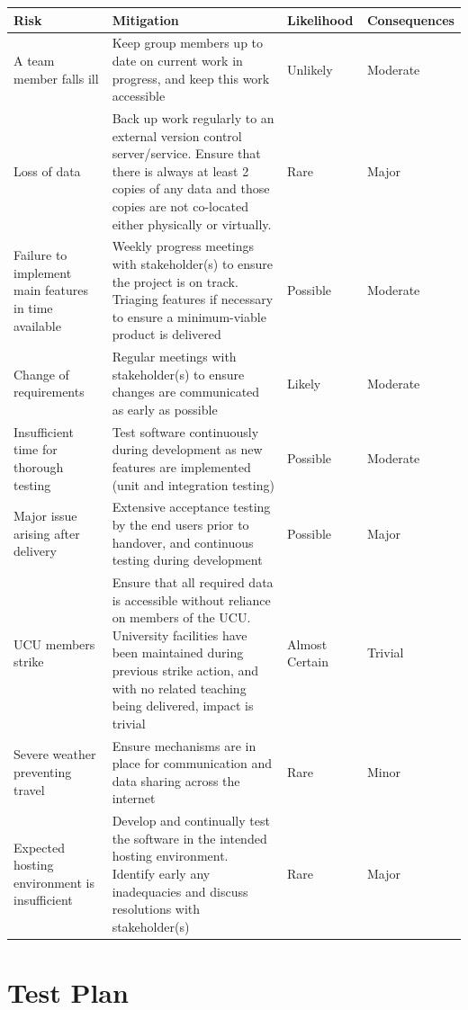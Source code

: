 \documentclass[11pt, a4paper]{article}
\begin{document}
\begin{landscape}
\begin{tabulary}{1.8\textwidth}{L|L|l|l}
	Risk & Mitigation & Likelihood & Consequences \\\toprule
	A team member falls ill & Keep group members up to date on current work in progress, and keep this work accessible & Unlikely & Moderate\\
	Loss of data & Back up work regularly to an external version control server/service. Ensure that there is always at least 2 copies of any data and those copies are not co-located either physically or virtually. & Rare & Major \\
	Failure to implement main features in time available & Weekly progress meetings with stakeholder(s) to ensure the project is on track. Triaging features if necessary to ensure a minimum-viable product is delivered & Possible & Moderate \\
	Change of requirements & Regular meetings with stakeholder(s) to ensure changes are communicated as early as possible & Likely & Moderate \\
	Insufficient time for thorough testing & Test software continuously during development as new features are implemented (unit and integration testing) & Possible & Moderate \\
	Major issue arising after delivery & Extensive acceptance testing by the end users prior to handover, and continuous testing during development & Possible & Major \\
	UCU members strike & Ensure that all required data is accessible without reliance on members of the UCU. University facilities have been maintained during previous strike action, and with no related teaching being delivered, impact is trivial & Almost Certain & Trivial \\ 
	Severe weather preventing travel & Ensure mechanisms are in place for communication and data sharing across the internet & Rare & Minor \\
	Expected hosting environment is insufficient & Develop and continually test the software in the intended hosting environment. Identify early any inadequacies and discuss resolutions with stakeholder(s) & Rare & Major \\

\end{tabulary}

\end{landscape}

\pagebreak
\section{Test Plan}
\end{document}
